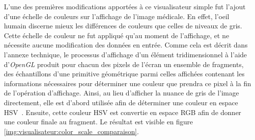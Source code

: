 {{{            L'une des premières modifications apportées à ce visualisateur simple fut l'ajout d'une échelle de couleurs sur l'affichage de l'image médicale. En effet, l'oeil humain discerne mieux les différences de couleurs que celles de niveaux de gris. Cette échelle de couleur ne fut appliqué qu'au moment de l'affichage, et ne nécessite aucune modification des données en entrée. Comme cela est décrit dans l'annexe technique, le processus d'affichage d'un élément tridimensionnel à l'aide d'\textit{OpenGL} produit pour chacun des pixels de l'écran un ensemble de fragments, des échantillons d'une primitive géométrique parmi celles affichées contenant les informations nécessaires pour déterminer une couleur que prendra ce pixel à la fin de l'opération d'affichage. Ainsi, au lieu d'afficher la nuance de gris de l'image directement, elle est d'abord utilisée afin de déterminer une couleur en espace HSV~\cite{cite_hsv_original_paper}. Ensuite, cette couleur HSV est convertie en espace RGB afin de donner une couleur finale au fragment. Le résultat est visible en figure \ref{img:visualisateur:color_scale_comparaison}.

}}}
